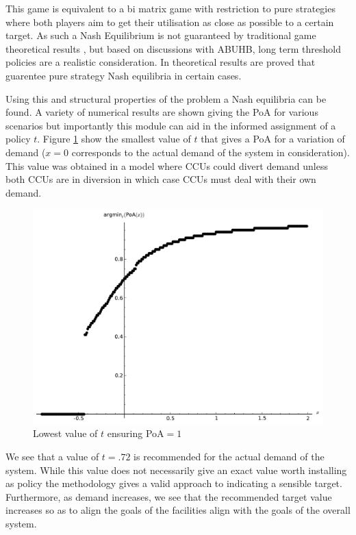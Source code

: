 \documentclass[a4paper,11pt]{article}
\begin{document}
This game is equivalent to a bi matrix game with restriction to pure strategies where both players aim to get their utilisation as close as possible to a certain target.
As such a Nash Equilibrium is not guaranteed by traditional game theoretical results \cite{Nash1950}, but based on discussions with ABUHB, long term threshold policies are a realistic consideration.
In \cite{knight2014} theoretical results are proved that guarentee pure strategy Nash equilibria in certain cases.

Using this and structural properties of the problem a Nash equilibria can be found.
A variety of numerical results are shown giving the PoA for various scenarios but importantly this module can aid in the informed assignment of a policy $t$.
Figure \ref{mintargetvdemandmodel2} show the smallest value of $t$ that gives a PoA for a variation of demand ($x=0$ corresponds to the actual demand of the system in consideration).
This value was obtained in a model where CCUs could divert demand unless both CCUs are in diversion in which case CCUs must deal with their own demand.

\begin{figure}[!htbp]
\begin{center}
\includegraphics[width=12cm]{./Images/argminPoAmodel2.pdf}
\caption{Lowest value of $t$ ensuring PoA$=1$} \label{mintargetvdemandmodel2}
\end{center}
\end{figure}

We see that a value of $t=.72$ is recommended for the actual demand of the system.
While this value does not necessarily give an exact value worth installing as policy the methodology gives a valid approach to indicating a sensible target.
Furthermore, as demand increases, we see that the recommended target value increases so as to align the goals of the facilities align with the goals of the overall system.
\end{document}
